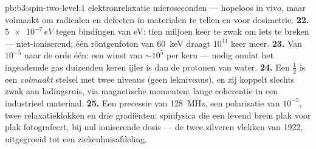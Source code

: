 \begin{solution}{pb:b3:spin-two-level:1}
elektronrelaxatie microseconden --- hopeloos in vivo, maar volmaakt om
radicalen en defecten in materialen te tellen en voor dosimetrie.
\textbf{22.} $\num{5e-7}\,\unit{eV}$ tegen bindingen van eV: tien miljoen
keer te zwak om iets te breken --- niet-ioniserend; één röntgenfoton van
\qty{60}{keV} draagt $10^{11}$ keer meer.
\textbf{23.} Van $10^{-5}$ naar de orde één: een winst van $\sim10^5$ per
kern --- nodig omdat het ingeademde gas duizenden keren ijler is dan de
protonen van water.
\textbf{24.} Een  $\tfrac12$ is een \emph{volmaakt} stelsel met twee
niveaus (geen lekniveaus), en zij koppelt slechts zwak aan ladingsruis,
via magnetische momenten: lange coherentie in een industrieel materiaal.
\textbf{25.} Een precessie van \qty{128}{MHz}, een polarisatie van
$10^{-5}$, twee relaxatieklokken en drie gradiënten: spinfysica die een
levend brein plak voor plak fotografeert, bij nul ioniserende dosis ---
de twee zilveren vlekken van 1922, uitgegroeid tot een
ziekenhuisafdeling.
\end{solution}
